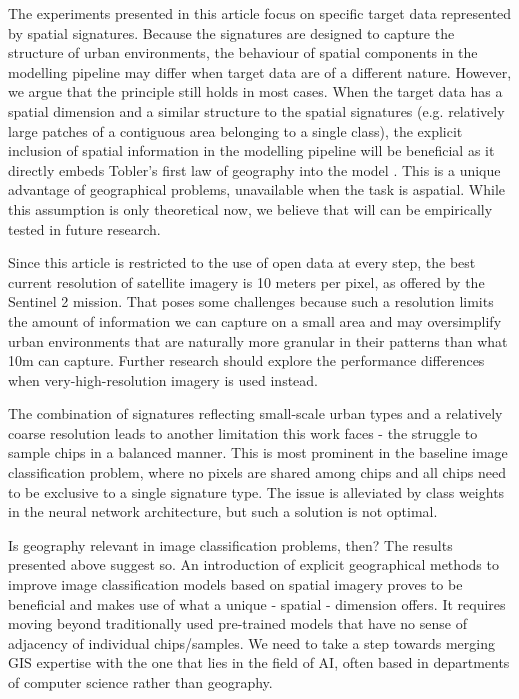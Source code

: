 The experiments presented in this article focus on specific target data represented by
spatial signatures. Because the signatures are designed to capture the structure of
urban environments, the behaviour of spatial components in the modelling pipeline may
differ when target data are of a different nature. However, we argue that the principle
still holds in most cases. When the target data has a spatial dimension and a similar
structure to the spatial signatures (e.g. relatively large patches of a contiguous area
belonging to a single class), the explicit inclusion of spatial information in the
modelling pipeline will be beneficial as it directly embeds Tobler's first law of
geography into the model \citep{tobler1970computer}. This is a unique advantage of
geographical problems, unavailable when the task is aspatial. While this assumption is
only theoretical now, we believe that will can be empirically tested in future research.

Since this article is restricted to the use of open data at every step, the best current
resolution of satellite imagery is 10 meters per pixel, as offered by the Sentinel 2
mission. That poses some challenges because such a resolution limits the amount of
information we can capture on a small area and may oversimplify urban environments that
are naturally more granular in their patterns than what 10m can capture. Further
research should explore the performance differences when very-high-resolution
imagery is used instead.

The combination of signatures reflecting small-scale urban types and a relatively coarse
resolution leads to another limitation this work faces - the struggle to sample chips
in a balanced manner. This is most prominent in the baseline image classification
problem, where no pixels are shared among chips and all chips need to be exclusive to a
single signature type. The issue is alleviated by class weights in the neural network
architecture, but such a solution is not optimal.

Is geography relevant in image classification problems, then? The results presented
above suggest so. An introduction of explicit geographical methods to improve image
classification models based on spatial imagery proves to be beneficial and makes use of what a
unique - spatial - dimension offers. It requires moving beyond traditionally used
pre-trained models that have no sense of adjacency of individual chips/samples. We need
to take a step towards merging GIS expertise with the one that lies in the field of
AI, often based in departments of computer science rather than geography.

